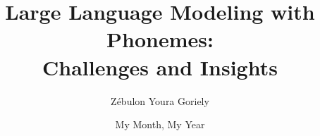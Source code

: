 
\title{Large Language Modeling with Phonemes:\\
Challenges and Insights}

\author{Z\'ebulon Youra Goriely}



\submissiondate{\today}


\date{My Month, My Year}


